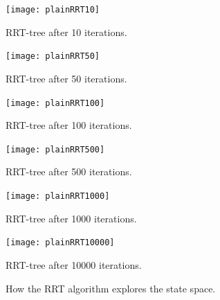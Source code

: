 \begin{figure}
  \centering
  \begin{minipage}[b]{0.3\textwidth}
    \texttt{[image: plainRRT10]}
    \caption{RRT-tree after 10 iterations.}
  \end{minipage}
  \begin{minipage}[b]{0.3\textwidth}
    \texttt{[image: plainRRT50]}
    \caption{RRT-tree after 50 iterations.}
  \end{minipage}
  \begin{minipage}[b]{0.3\textwidth}
    \texttt{[image: plainRRT100]}
    \caption{RRT-tree after 100 iterations.}
  \end{minipage}
  \newline %
  \begin{minipage}[b]{0.3\textwidth}
    \texttt{[image: plainRRT500]}
    \caption{RRT-tree after 500 iterations.}
  \end{minipage}
  \begin{minipage}[b]{0.3\textwidth}
    \texttt{[image: plainRRT1000]}
    \caption{RRT-tree after 1000 iterations.}
  \end{minipage}
  \begin{minipage}[b]{0.3\textwidth}
    \texttt{[image: plainRRT10000]}
    \caption{RRT-tree after 10000 iterations.}
  \end{minipage}
  \caption{How the \ac{RRT} algorithm explores the state space.}
  \label{fig:rrt-expansion}
\end{figure}


